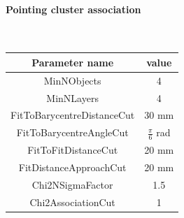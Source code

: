 \documentclass[cits]{JINST}
\begin{document}
\paragraph{Pointing cluster association} ~

\begin{table}[!ht]
  \begin{center}
    \begin{tabu} to \linewidth { c | c } 
          Parameter name & value \\
          \hline
          MinNObjects & 4 \\
          MinNLayers & 4 \\
          FitToBarycentreDistanceCut & 30 mm \\
          FitToBarycentreAngleCut & $\frac{\pi}{6}$ rad \\
          FitToFitDistanceCut & 20 mm \\
          FitDistanceApproachCut & 20 mm \\
          Chi2NSigmaFactor & 1.5 \\
          Chi2AssociationCut & 1
    \end{tabu}
  \end{center}
\end{table}
\end{document}
